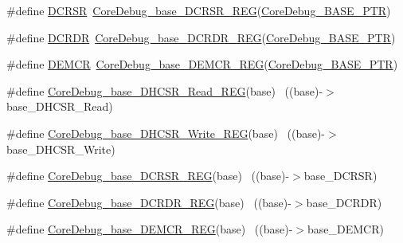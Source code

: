 \begin{DoxyCompactItemize}
\item 
\#define \hyperlink{group___core_debug___register___accessor___macros_gabd5ddab120c0e09c0198d49c25713be3}{D\+C\+R\+SR}~\hyperlink{group___core_debug___register___accessor___macros_ga5f44f54e6c3b28720c9f888292d2eef5}{Core\+Debug\+\_\+base\+\_\+\+D\+C\+R\+S\+R\+\_\+\+R\+EG}(\hyperlink{group___core_debug___peripheral_ga994a185afca30ede538d89322c4f0326}{Core\+Debug\+\_\+\+B\+A\+S\+E\+\_\+\+P\+TR})
\item 
\#define \hyperlink{group___core_debug___register___accessor___macros_gaaa7a4f8f79faea1305f3398257c656a0}{D\+C\+R\+DR}~\hyperlink{group___core_debug___register___accessor___macros_gac60388e54792a5460ba042a1e6917ce7}{Core\+Debug\+\_\+base\+\_\+\+D\+C\+R\+D\+R\+\_\+\+R\+EG}(\hyperlink{group___core_debug___peripheral_ga994a185afca30ede538d89322c4f0326}{Core\+Debug\+\_\+\+B\+A\+S\+E\+\_\+\+P\+TR})
\item 
\#define \hyperlink{group___core_debug___register___accessor___macros_gab6c5b1baf444f12ba50bfc3b0e40e05c}{D\+E\+M\+CR}~\hyperlink{group___core_debug___register___accessor___macros_ga068f04cd2820bf5a12caeb1c9f6afa51}{Core\+Debug\+\_\+base\+\_\+\+D\+E\+M\+C\+R\+\_\+\+R\+EG}(\hyperlink{group___core_debug___peripheral_ga994a185afca30ede538d89322c4f0326}{Core\+Debug\+\_\+\+B\+A\+S\+E\+\_\+\+P\+TR})
\item 
\#define \hyperlink{group___core_debug___register___accessor___macros_gaea44925e7b9cc3155d55c86d77ecb8dc}{Core\+Debug\+\_\+base\+\_\+\+D\+H\+C\+S\+R\+\_\+\+Read\+\_\+\+R\+EG}(base)        ~((base)-\/$>$base\+\_\+\+D\+H\+C\+S\+R\+\_\+\+Read)
\item 
\#define \hyperlink{group___core_debug___register___accessor___macros_gaf54a5a2086e1362b034c5ae9d566f261}{Core\+Debug\+\_\+base\+\_\+\+D\+H\+C\+S\+R\+\_\+\+Write\+\_\+\+R\+EG}(base)      ~((base)-\/$>$base\+\_\+\+D\+H\+C\+S\+R\+\_\+\+Write)
\item 
\#define \hyperlink{group___core_debug___register___accessor___macros_ga5f44f54e6c3b28720c9f888292d2eef5}{Core\+Debug\+\_\+base\+\_\+\+D\+C\+R\+S\+R\+\_\+\+R\+EG}(base)                  ~((base)-\/$>$base\+\_\+\+D\+C\+R\+SR)
\item 
\#define \hyperlink{group___core_debug___register___accessor___macros_gac60388e54792a5460ba042a1e6917ce7}{Core\+Debug\+\_\+base\+\_\+\+D\+C\+R\+D\+R\+\_\+\+R\+EG}(base)                  ~((base)-\/$>$base\+\_\+\+D\+C\+R\+DR)
\item 
\#define \hyperlink{group___core_debug___register___accessor___macros_ga068f04cd2820bf5a12caeb1c9f6afa51}{Core\+Debug\+\_\+base\+\_\+\+D\+E\+M\+C\+R\+\_\+\+R\+EG}(base)                  ~((base)-\/$>$base\+\_\+\+D\+E\+M\+CR)

\end{DoxyCompactItemize}
